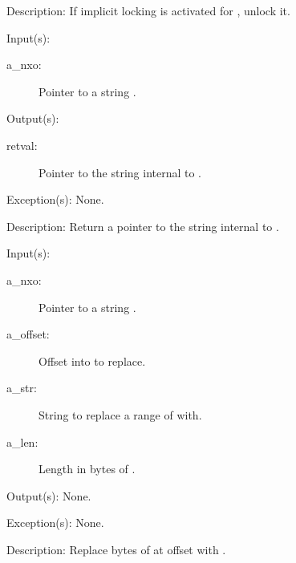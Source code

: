 \begin{capi}
\begin{capilist}
	\item[Description: ]
		If implicit locking is activated for , unlock it.
	\end{capilist}
\label{nxo_string_get}
	\begin{capilist}
	\item[Input(s): ]
		\begin{description}\item[]
		\item[a\_nxo: ]
			Pointer to a string .
		\end{description}
	\item[Output(s): ]
		\begin{description}\item[]
		\item[retval: ]
			Pointer to the string internal to .
		\end{description}
	\item[Exception(s): ] None.
	\item[Description: ]
		Return a pointer to the string internal to .
	\end{capilist}
\label{nxo_string_set}
	\begin{capilist}
	\item[Input(s): ]
		\begin{description}\item[]
		\item[a\_nxo: ]
			Pointer to a string \classname{nxo}.
		\item[a\_offset: ]
			Offset into  to replace.
		\item[a\_str: ]
			String to replace a range of \cvar{a\_nxo} with.
		\item[a\_len: ]
			Length in bytes of \cvar{a\_str}.
		\end{description}
	\item[Output(s): ] None.
	\item[Exception(s): ] None.
	\item[Description: ]
		Replace  bytes of  at offset
		 with \cvar{a\_str}.
	\end{capilist}
\end{capi}
